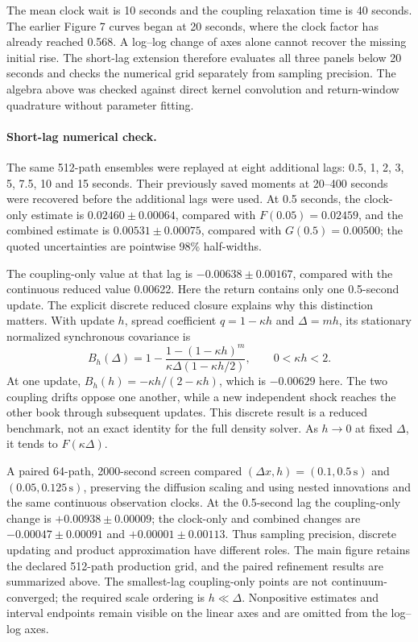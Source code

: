 The mean clock wait is 10 seconds and the coupling relaxation time is 40 seconds. The earlier Figure 7 curves began at 20 seconds, where the clock factor has already reached 0.568. A log--log change of axes alone cannot recover the missing initial rise. The short-lag extension therefore evaluates all three panels below 20 seconds and checks the numerical grid separately from sampling precision. The algebra above was checked against direct kernel convolution and return-window quadrature without parameter fitting.

\paragraph{Short-lag numerical check.}
The same 512-path ensembles were replayed at eight additional lags: 0.5, 1, 2, 3, 5, 7.5, 10 and 15 seconds. Their previously saved moments at 20--400 seconds were recovered before the additional lags were used. At 0.5 seconds, the clock-only estimate is $0.02460\pm0.00064$, compared with $F(0.05)=0.02459$, and the combined estimate is $0.00531\pm0.00075$, compared with $G(0.5)=0.00500$; the quoted uncertainties are pointwise 98\% half-widths.

The coupling-only value at that lag is $-0.00638\pm0.00167$, compared with the continuous reduced value 0.00622. Here the return contains only one 0.5-second update. The explicit discrete reduced closure explains why this distinction matters. With update $h$, spread coefficient $q=1-\kappa h$ and $\Delta=mh$, its stationary normalized synchronous covariance is
\begin{equation}
B_h(\Delta)=1-\frac{1-(1-\kappa h)^m}
 {\kappa\Delta(1-\kappa h/2)},\qquad 0<\kappa h<2.
\label{eq:discrete-coupling}
\end{equation}
At one update, $B_h(h)=-\kappa h/(2-\kappa h)$, which is $-0.00629$ here. The two coupling drifts oppose one another, while a new independent shock reaches the other book through subsequent updates. This discrete result is a reduced benchmark, not an exact identity for the full density solver. As $h\to0$ at fixed $\Delta$, it tends to $F(\kappa\Delta)$.

A paired 64-path, 2000-second screen compared $(\Delta x,h)=(0.1,0.5\,\mathrm{s})$ and $(0.05,0.125\,\mathrm{s})$, preserving the diffusion scaling and using nested innovations and the same continuous observation clocks. At the 0.5-second lag the coupling-only change is $+0.00938\pm0.00009$; the clock-only and combined changes are $-0.00047\pm0.00091$ and $+0.00001\pm0.00113$. Thus sampling precision, discrete updating and product approximation have different roles. The main figure retains the declared 512-path production grid, and the paired refinement results are summarized above. The smallest-lag coupling-only points are not continuum-converged; the required scale ordering is $h\ll\Delta$. Nonpositive estimates and interval endpoints remain visible on the linear axes and are omitted from the log--log axes.
